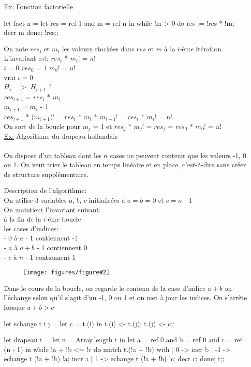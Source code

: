 \documentclass{article}
\newcommand{\schem}[3]
{
	\begin{figure}[ht]
		\centering
		\textbf{#1}\par\medskip
		\texttt{[image: figures/figure\#2]}
		\caption{}
	\end{figure}
}
\begin{document}
	\underline{Ex:} Fonction factorielle
	
	\begin{case}
let fact n =
	let res = ref 1 and m = ref n in
		while !m > 0 do
			res := !res * !m; decr m
		done; !res;;
    	\end{case}
			
			 On note $res_i$ et $m_i$ les valeurs stockées dans $res$ et $m$ à la $i$-ème itération.\\
			L'invariant est: $res_i$ * $m_i$! = $n$!\\
			$i$ = 0 $res_0$ = 1 $m_0$! = $n$!\\
			vrai $i$ = 0\\
			$H_i$ =$>$ $H_{i+1}$ ?\\
			$res_{i+1}$ = $res_i$ * $m_i$\\
			$m_{i+1}$ = $m_i$ - 1\\
			$res_{i+1}$ * ($m_{i+1}$)! = $res_i$ * $m_i$ * $m_{i-1}$! = $res_i$ * $m_i$! = n!\\
			On sort de la boucle pour $m_j$ = 1 et $res_j$ * $m_j$! = $res_j$ = $res_0$ * $m_0$! = $n$!\\
			
			\underline{Ex:} Algorithme du drapeau hollandais\\\\
			On dispose d'un tableau dont les $n$ cases ne peuvent contenir que les valeurs -1, 0 ou 1. On veut trier le tableau en temps linéaire et en place, c'est-à-dire sans créer de structure supplémentaire.
			
			Description de l'algorithme:\\
			On utilise 3 variables $a$, $b$, $c$ initialisées à $a = b$ = 0 et $c = n$ - 1\\
			On maintient l'invariant suivant:\\
			à la fin de la $i$-ème boucle\\
			les cases d'indices:\\
			- 0 à $a$ - 1 contiennent -1\\
			- $a$ à $a + b$ - 1 contiennent 0\\
			- $c$ à $n$ - 1 contiennent 1
			
			\schem{}{2}{0.3}
			
			 Dans le cours de la boucle, on regarde le contenu de la case d'indice $a + b$ on l'échange selon qu'il s'agit d'un -1, 0 ou 1 et on met à jour les indices.
			On s'arrête lorsque $a + b > c$\\
			\begin{case}
let echange t i j =
	let c = t.(i) in
		t.(i) <- t.(j);
		t.(j) <- c;;
		
let drapeau t =
	let n = Array.length t in
		let a = ref 0 and b = ref 0 and c = ref (n - 1) in
			while !a + !b <= !c do
				match t.(!a + !b) with
				| 0 -> incr b
				| -1 -> echange t (!a + !b) !a; incr a
				| 1 -> echange t (!a + !b) !c; decr c;
			done;
		t;;
			\end{case}
\end{document}
